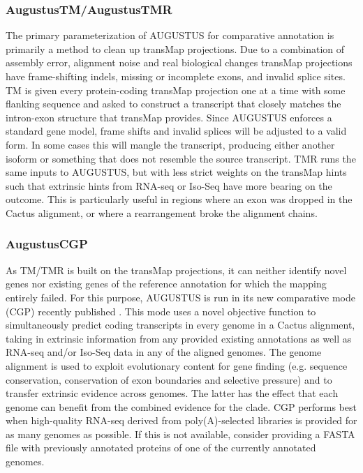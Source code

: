 \subsubsection*{AugustusTM/AugustusTMR}
	The primary parameterization of AUGUSTUS for comparative annotation is primarily a method to clean up transMap projections. Due to a combination of assembly error, alignment noise and real biological changes transMap projections have frame-shifting indels, missing or incomplete exons, and invalid splice sites. TM is given every protein-coding transMap projection one at a time with some flanking sequence and asked to construct a transcript that closely matches the intron-exon structure that transMap provides. Since AUGUSTUS enforces a standard gene model, frame shifts and invalid splices will be adjusted to a valid form. In some cases this will mangle the transcript, producing either another isoform or something that does not resemble the source transcript. TMR runs the same inputs to AUGUSTUS, but with less strict weights on the transMap hints such that extrinsic hints from RNA-seq or Iso-Seq have more bearing on the outcome. This is particularly useful in regions where an exon was dropped in the Cactus alignment, or where a rearrangement broke the alignment chains.
  
\subsubsection*{AugustusCGP}
	As TM/TMR is built on the transMap projections, it can neither identify novel genes nor existing genes of the reference annotation for which the mapping entirely failed. For this purpose, AUGUSTUS is run in its new comparative mode (CGP) recently published  \citep{konig2015simultaneous}. This mode uses a novel objective function to simultaneously predict coding transcripts in every genome in a Cactus alignment, taking in extrinsic information from any provided existing annotations as well as RNA-seq and/or Iso-Seq data in any of the aligned genomes. The genome alignment is used to exploit evolutionary content for gene finding (e.g. sequence conservation, conservation of exon boundaries and selective pressure) and to transfer extrinsic evidence across genomes. The latter has the effect that each genome can benefit from the combined evidence for the clade. CGP performs best when high-quality RNA-seq derived from poly(A)-selected libraries is provided for as many genomes as possible. If this is not available, consider providing a FASTA file with previously annotated proteins of one of the currently annotated genomes. 
  
